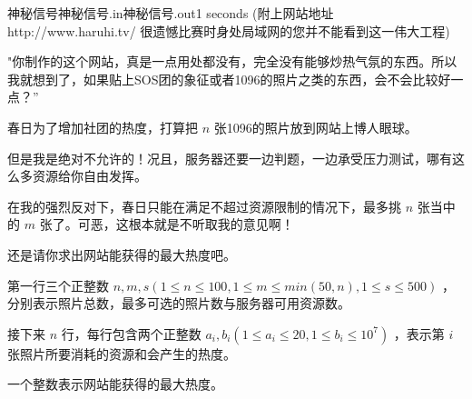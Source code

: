 \begin{problem}{神秘信号}{神秘信号.in}{神秘信号.out}{1 seconds}
(附上网站地址 http://www.haruhi.tv/ 很遗憾比赛时身处局域网的您并不能看到这一伟大工程)

"你制作的这个网站，真是一点用处都没有，完全没有能够炒热气氛的东西。所以我就想到了，如果贴上SOS团的象征或者1096的照片之类的东西，会不会比较好一点？”

春日为了增加社团的热度，打算把 $n$ 张1096的照片放到网站上博人眼球。

但是我是绝对不允许的！况且，服务器还要一边判题，一边承受压力测试，哪有这么多资源给你自由发挥。

在我的强烈反对下，春日只能在满足不超过资源限制的情况下，最多挑 $n$ 张当中的 $m$ 张了。可恶，这根本就是不听取我的意见啊！

还是请你求出网站能获得的最大热度吧。

\InputFile

第一行三个正整数 $n,m,s (1 \leq n \leq 100 , 1 \leq m \leq min(50,n) , 1 \leq s \leq 500 )$ ，分别表示照片总数，最多可选的照片数与服务器可用资源数。

接下来 $n$ 行，每行包含两个正整数 $a_i,b_i (1 \leq a_i \leq 20 , 1 \leq b_i \leq 10^7)$ ，表示第 $i$ 张照片所要消耗的资源和会产生的热度。 

\OutputFile

一个整数表示网站能获得的最大热度。

\Example
\begin{example}
%
\end{example}
\end{problem}
